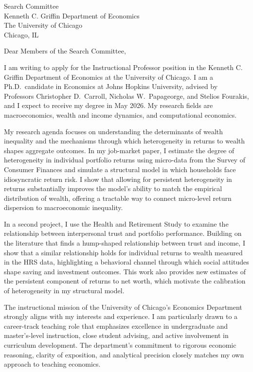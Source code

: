 \documentclass[11pt,letterpaper]{letter}
\begin{document}
\begin{letter}{Search Committee \\
Kenneth C. Griffin Department of Economics \\
The University of Chicago \\
Chicago, IL}

\opening{Dear Members of the Search Committee,}

I am writing to apply for the Instructional Professor position in the Kenneth C. Griffin Department of Economics at the University of Chicago. I am a Ph.D.\ candidate in Economics at Johns Hopkins University, advised by Professors Christopher D.~Carroll, Nicholas W.~Papageorge, and Stelios Fourakis, and I expect to receive my degree in May 2026. My research fields are macroeconomics, wealth and income dynamics, and computational economics.

My research agenda focuses on understanding the determinants of wealth inequality and the mechanisms through which heterogeneity in returns to wealth shapes aggregate outcomes. In my job-market paper, I estimate the degree of heterogeneity in individual portfolio returns using micro-data from the Survey of Consumer Finances and simulate a structural model in which households face idiosyncratic return risk. I show that allowing for persistent heterogeneity in returns substantially improves the model’s ability to match the empirical distribution of wealth, offering a tractable way to connect micro-level return dispersion to macroeconomic inequality.

In a second project, I use the Health and Retirement Study to examine the relationship between interpersonal trust and portfolio performance. Building on the literature that finds a hump-shaped relationship between trust and income, I show that a similar relationship holds for individual returns to wealth measured in the HRS data, highlighting a behavioral channel through which social attitudes shape saving and investment outcomes. This work also provides new estimates of the persistent component of returns to net worth, which motivate the calibration of heterogeneity in my structural model.

The instructional mission of the University of Chicago’s Economics Department strongly aligns with my interests and experience. I am particularly drawn to a career-track teaching role that emphasizes excellence in undergraduate and master’s-level instruction, close student advising, and active involvement in curriculum development. The department’s commitment to rigorous economic reasoning, clarity of exposition, and analytical precision closely matches my own approach to teaching economics.


\end{letter}
\end{document}
